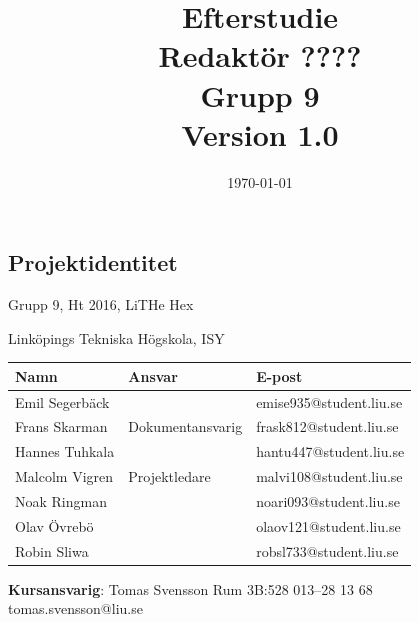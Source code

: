 \documentclass[a4paper,titlepage,12pt]{article}
\begin{document}
	\title{\LARGE
		\textbf{Efterstudie} \\
		\vspace*{0.5\baselineskip}
		\large
		Redaktör ???? \\
		Grupp 9 \\
		\small
		\vspace*{0.5\baselineskip}
		Version 1.0}
	
	\date{\today}
	
	\maketitle
	
	\newpage
	
	\begin{center}
		
		
		\section*{Projektidentitet}
		Grupp 9, Ht 2016, LiTHe Hex
		
		Linköpings Tekniska Högskola, ISY
		
		\renewcommand*{\arraystretch}{1.4}
		\begin{longtable}[c]{ l l l }
			\textbf{Namn} & \textbf{Ansvar} & \textbf{E-post} \\ \midrule
			Emil Segerbäck & & emise935@student.liu.se \\ \midrule
			Frans Skarman & Dokumentansvarig & frask812@student.liu.se \\ \midrule
			Hannes Tuhkala & & hantu447@student.liu.se \\ \midrule
			Malcolm Vigren & Projektledare & malvi108@student.liu.se \\ \midrule
			Noak Ringman &  & noari093@student.liu.se \\ \midrule
			Olav Övrebö &  & olaov121@student.liu.se \\ \midrule
			Robin Sliwa &  & robsl733@student.liu.se \\
		\end{longtable}
		
		\centering
		\textbf{Kursansvarig}: Tomas Svensson Rum 3B:528 013--28 13 68 tomas.svensson@liu.se
		
		\newpage
		\tableofcontents
		\newpage
		

\end{center}
\end{document}
